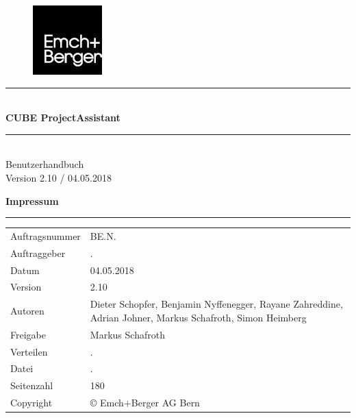 \documentclass[12pt]{article} %
\newcommand{\HRule}{\rule{\linewidth}{0.5mm}} %
\begin{document}

\begin{titlepage}


\begin{figure}[t] %
\flushright  %
\includegraphics[width=0.2\linewidth]{0_EmBeLogo}
\end{figure}

\vspace*{6cm}

\center %

\HRule \\[0.4cm]
{ \huge \bfseries CUBE ProjectAssistant}\\[0.4cm] %
\HRule \\[1.5cm]

\textsf{\Large Benutzerhandbuch}\\[0.5cm] %
\textsf{\large Version 2.10 / 04.05.2018}\\[0.5cm] %


\pagebreak
\vspace*{15cm}

\flushleft\textbf{ Impressum}
\rule{\textwidth}{1pt}

\begin{tabular}{lp{12cm}}
Auftragsnummer & BE.N.\\
Auftraggeber & .\\
Datum & 04.05.2018\\
Version & 2.10\\
Autoren & Dieter Schopfer, Benjamin Nyffenegger, Rayane Zahreddine, Adrian Johner, Markus Schafroth, Simon Heimberg\\
Freigabe & Markus Schafroth\\
Verteilen & .\\
Datei & .\\
Seitenzahl & 180\\
Copyright & \copyright{ Emch+Berger AG Bern}\\
\end{tabular}


\end{titlepage}
\end{document}
